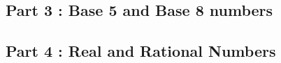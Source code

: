 \documentclass[12pt]{article}
\begin{document}
\subsection*{Part 3 : Base 5 and Base 8 numbers}


\subsection*{Part 4 : Real and Rational Numbers}


\newpage
\end{document}
